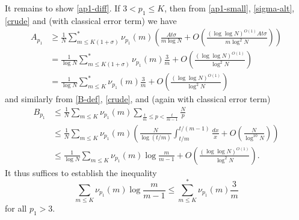 \documentclass[10pt,a4paper,reqno]{amsart}
\numberwithin{equation}{section}
\theoremstyle{plain}
\theoremstyle{definition}
\begin{document}
It remains to show \eqref{ap1-diff}.  If $3 < p_1 \leq K$, then from \eqref{ap1-small}, \eqref{sigma-alt}, \eqref{crude} and  (with classical error term) we have
\begin{align*}
A_{p_1} &\geq \frac{1}{N} \sum_{m \leq K(1+\sigma)}^* \nu_{p_1}(m) \left( \frac{A t \sigma}{m \log N} + O\left( \frac{(\log\log N)^{O(1)}A t \sigma}{m \log^2 N} \right) \right) \\
&= \frac{1}{\log N} \sum_{m \leq K(1+\sigma)}^* \nu_{p_1}(m) \frac{3}{m}+ O\left( \frac{(\log\log N)^{O(1)}}{\log^2 N} \right) \\
&= \frac{1}{\log N} \sum_{m \leq K}^* \nu_{p_1}(m) \frac{3}{m}+ O\left( \frac{(\log\log N)^{O(1)}}{\log^2 N} \right)
\end{align*}
and similarly from \eqref{B-def}, \eqref{crude}, and  (again with classical error term)
\begin{align*}
  B_{p_1} &\leq
  \frac{1}{N} \sum_{m \leq K} \nu_{p_1}(m) \sum_{\frac{t}{m} \leq p < \frac{t}{m-1}} \frac{N}{p}  \\
  &\leq \frac{1}{N} \sum_{m \leq K} \nu_{p_1}(m) \left( \frac{N}{\log(t/m)} \int_{t/m}^{t/(m-1)} \frac{dx}{x} + O\left( \frac{N}{\log^{10} N} \right) \right) \\
  &\leq \frac{1}{\log N} \sum_{m \leq K} \nu_{p_1}(m) \log \frac{m}{m-1} + O\left( \frac{(\log\log N)^{O(1)}}{\log^2 N} \right).
\end{align*}
It thus suffices to establish the inequality
\begin{equation}\label{key-ineq}
   \sum_{m \leq K} \nu_{p_1}(m) \log \frac{m}{m-1} \leq \sum_{m \leq K}^* \nu_{p_1}(m) \frac{3}{m}
\end{equation}
for all $p_1 > 3$.
\end{document}
